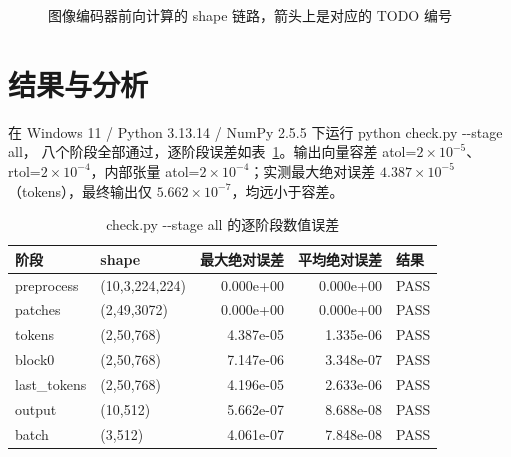 \documentclass[a4paper,12pt]{article}
\newcommand{\code}[1]{{\ttfamily\footnotesize #1}}
\begin{document}
\begin{figure}[H]
\centering
{}
\caption{图像编码器前向计算的 shape 链路，箭头上是对应的 TODO 编号}
\label{fig:chain}
\end{figure}

\section{结果与分析}

在 Windows 11 / Python 3.13.14 / NumPy 2.5.5 下运行 \code{python check.py -{}-stage all}，
八个阶段全部通过，逐阶段误差如表~\ref{tab:err}。输出向量容差 atol=$2\!\times\!10^{-5}$、
rtol=$2\!\times\!10^{-4}$，内部张量 atol=$2\!\times\!10^{-4}$；实测最大绝对误差
$4.387\times10^{-5}$（tokens），最终输出仅 $5.662\times10^{-7}$，均远小于容差。

\begin{table}[H]
\centering
\footnotesize
\setlength{\tabcolsep}{4pt}
\caption{\code{check.py -{}-stage all} 的逐阶段数值误差}
\label{tab:err}
\begin{tabular}{@{}l l r r l@{}}
\toprule
\textbf{阶段} & \textbf{shape} & \textbf{最大绝对误差} & \textbf{平均绝对误差} & \textbf{结果} \\
\midrule
preprocess   & (10,3,224,224) & 0.000e+00 & 0.000e+00 & PASS \\
patches      & (2,49,3072)    & 0.000e+00 & 0.000e+00 & PASS \\
tokens       & (2,50,768)     & 4.387e-05 & 1.335e-06 & PASS \\
block0       & (2,50,768)     & 7.147e-06 & 3.348e-07 & PASS \\
last\_tokens & (2,50,768)     & 4.196e-05 & 2.633e-06 & PASS \\
output       & (10,512)       & 5.662e-07 & 8.688e-08 & PASS \\
batch        & (3,512)        & 4.061e-07 & 7.848e-08 & PASS \\
\bottomrule
\end{tabular}
\end{table}
\end{document}
